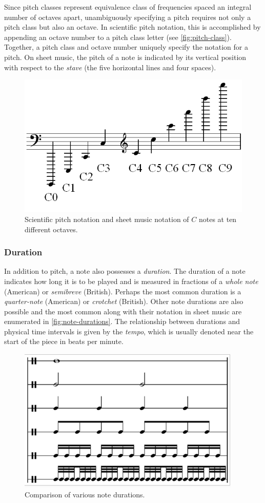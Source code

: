 \documentclass[dissertation.tex]{subfiles}
\begin{document}
Since pitch classes represent equivalence class of frequencies spaced an
integral number of octaves apart, unambiguously specifying a pitch requires not
only a pitch class but also an octave. In scientific pitch notation, this is
accomplished by appending an octave number to a pitch class letter (see
\autoref{fig:pitch-class}). Together, a pitch class and octave number uniquely
specify the notation for a pitch. On sheet music, the pitch of a note is
indicated by its vertical position with respect to the \emph{stave} (the five
horizontal lines and four spaces).

\begin{figure}[htpb]
    \centering
    \includegraphics[width=0.6\linewidth]{Figures/Pitch_notation.png}
    \caption{Scientific pitch notation and sheet music notation of $C$ notes at
    ten different octaves.  }
    \label{fig:pitch-class}
\end{figure}

\subsubsection{Duration}

In addition to pitch, a note also possesses a \emph{duration}. The duration of
a note indicates how long it is to be played and is measured in fractions of a
\emph{whole note} (American) or \emph{semibreve} (British). Perhaps the most
common duration is a \emph{quarter-note} (American) or \emph{crotchet}
(British). Other note durations are also possible and the most common along
with their notation in sheet music are enumerated in
\autoref{fig:note-durations}. The relationship between durations and
physical time intervals is given by the \emph{tempo}, which is usually
denoted near the start of the piece in beats per minute.

\begin{figure}[htpb]
    \centering
    \includegraphics[width=0.6\linewidth]{Figures/note-durations.png}
    \caption{Comparison of various note durations. }
    \label{fig:note-durations}
\end{figure}
\end{document}
